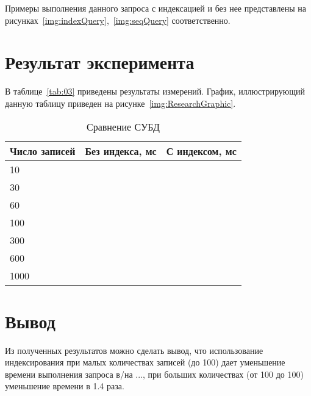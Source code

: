 Примеры выполнения данного запроса с индексацией и без нее представлены на
рисунках~\ref{img:indexQuery},~\ref{img:seqQuery} соответственно.


\section{Результат эксперимента}

В таблице~\ref{tab:03} приведены результаты измерений. График, иллюстрирующий
данную таблицу приведен на рисунке~\ref{img:ResearchGraphic}.

\begin{table}[ht!]
\captionsetup{format=hang,justification=raggedright,
              singlelinecheck=off,width=12cm}
\centering
\caption{Сравнение СУБД\label{tab:02}}
\begin{tabular}[Hc]{|p{3cm}|c|c|}
    \hline
    \multicolumn{1}{|c}{\textbf{Число записей}} &
    \multicolumn{1}{|c|}{\textbf{Без индекса, мс}} &
    \multicolumn{1}{c|}{\textbf{С индексом, мс}}\\
    \hline
    10   &  &  \\
    \hline
    30   &  &  \\
    \hline
    60   &  &  \\
    \hline
    100  &  &  \\
    \hline
    300  &  &  \\
    \hline
    600  &  &  \\
    \hline
    1000 &  &  \\
    \hline
\end{tabular}
\end{table}


\section*{Вывод}

Из полученных результатов можно сделать вывод, что использование индексирования
при малых количествах записей (до 100) дает уменьшение времени выполнения
запроса в/на ..., при больших количествах (от 100 до 100) уменьшение времени в
1.4 раза.
